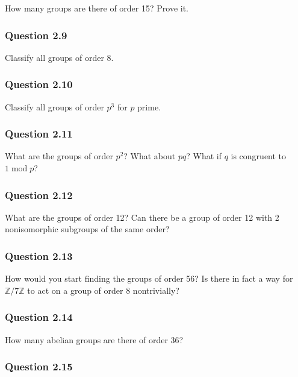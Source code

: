 How many groups are there of order 15? Prove it.

\hypertarget{question-2.9}{%
\subsubsection{Question 2.9}\label{question-2.9}}

Classify all groups of order 8.

\hypertarget{question-2.10}{%
\subsubsection{Question 2.10}\label{question-2.10}}

Classify all groups of order \(p^3\) for \(p\) prime.

\hypertarget{question-2.11}{%
\subsubsection{Question 2.11}\label{question-2.11}}

What are the groups of order \(p^2\)? What about \(pq\)? What if \(q\)
is congruent to \(1\operatorname{mod}p\)?

\hypertarget{question-2.12}{%
\subsubsection{Question 2.12}\label{question-2.12}}

What are the groups of order 12? Can there be a group of order 12 with 2
nonisomorphic subgroups of the same order?

\hypertarget{question-2.13}{%
\subsubsection{Question 2.13}\label{question-2.13}}

How would you start finding the groups of order 56? Is there in fact a
way for \({\mathbb{Z}}/7{\mathbb{Z}}\) to act on a group of order 8
nontrivially?

\hypertarget{question-2.14}{%
\subsubsection{Question 2.14}\label{question-2.14}}

How many abelian groups are there of order 36?

\hypertarget{question-2.15}{%
\subsubsection{Question 2.15}\label{question-2.15}}

